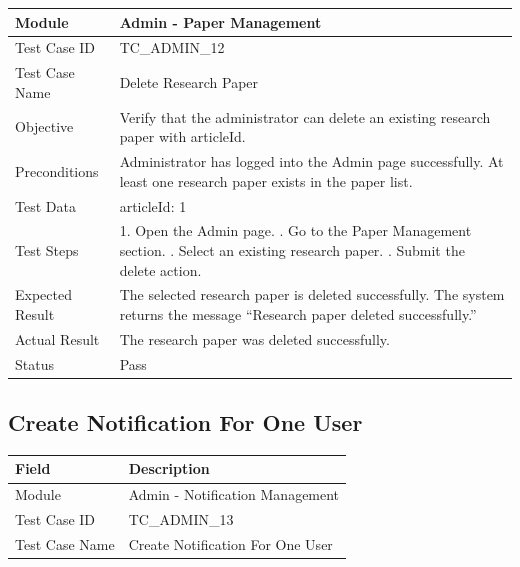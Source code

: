 \documentclass[12pt,a4paper]{article}
\begin{document}
{{\begin{longtable}{|p{4cm}|p{10cm}|}
	Module & Admin - Paper Management \\ \hline
	
	Test Case ID & TC\_ADMIN\_12 \\ \hline
	
	Test Case Name & Delete Research Paper \\ \hline
	
	Objective &
	Verify that the administrator can delete an existing research paper with articleId. \\ \hline
	
	Preconditions &
	Administrator has logged into the Admin page successfully. \newline
	At least one research paper exists in the paper list.
	\\ \hline
	
	Test Data &
	articleId: 1
	\\ \hline
	
	Test Steps &
	1. Open the Admin page. \newline
	2. Go to the Paper Management section. \newline
	3. Select an existing research paper. \newline
	4. Submit the delete action.
	\\ \hline
	
	Expected Result &
	The selected research paper is deleted successfully. The system returns the message ``Research paper deleted successfully.'' \\ \hline
	
	Actual Result &
	The research paper was deleted successfully. \\ \hline
	
	Status & Pass \\ \hline
	
\end{longtable}
\subsection{Create Notification For One User}
\begin{longtable}{|p{4cm}|p{10cm}|}
	\hline
	\textbf{Field} & \textbf{Description} \\ \hline
	
	Module & Admin - Notification Management \\ \hline
	
	Test Case ID & TC\_ADMIN\_13 \\ \hline
	
	Test Case Name & Create Notification For One User \\ \hline
	

\end{longtable}}}
\end{document}
